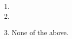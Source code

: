 
\begin{solution}

\phantom{}

\begin{enumerate}[label = (\alph*)]
    \item
    \item
    \item None of the above.
\end{enumerate}

\end{solution}

